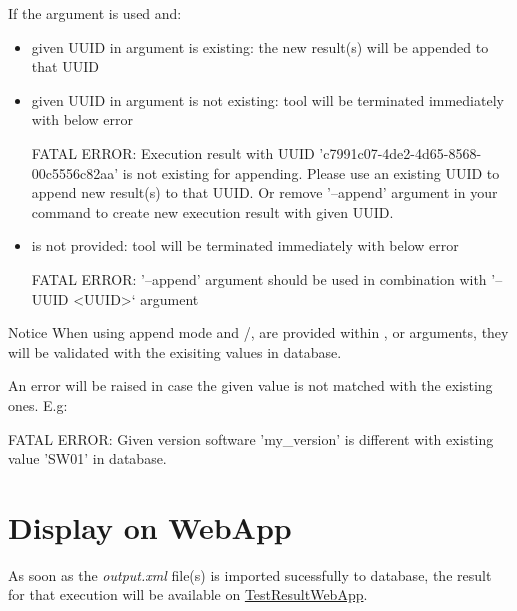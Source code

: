     If the argument  is used and:
    \begin{itemize}
      \item given UUID in  argument is existing: 
            the new result(s) will be appended to that UUID
      \item given UUID in  argument is not existing: 
            tool will be terminated immediately with below error
\begin{robotlog}
FATAL ERROR: Execution result with UUID 'c7991c07-4de2-4d65-8568-00c5556c82aa' is not existing for appending.
             Please use an existing UUID to append new result(s) to that UUID.
             Or remove '--append' argument in your command to create new execution result with given UUID.
\end{robotlog}
      \item {} is not provided: 
            tool will be terminated immediately with below error
\begin{robotlog}
FATAL ERROR: '--append' argument should be used in combination with '--UUID <UUID>` argument
\end{robotlog}
    \end{itemize} 

    \begin{boxhint} {Notice}
      When using append mode and /, 
       are provided within , 
       or  arguments, they will 
      be validated with the exisiting values in database. 
      
      An error will be raised in case the given value is not matched with the 
      existing ones. E.g:
\begin{robotlog}
FATAL ERROR: Given version software 'my_version' is different with existing value 'SW01' in database.
\end{robotlog}
    \end{boxhint}

\newpage
\hypertarget{description-display-on-webapp}{%
\section{Display on WebApp}\label{description-display-on-webapp}}

As soon as the \emph{output.xml} file(s) is imported sucessfully to database, 
the result for that execution will be available on
\href{https://github.com/test-fullautomation/testresultwebapp}{TestResultWebApp}.

